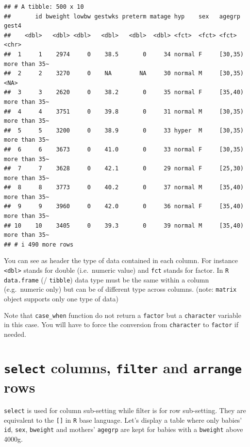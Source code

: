 \documentclass[
]{book}
\begin{document}
\begin{verbatim}
## # A tibble: 500 x 10
##       id bweight lowbw gestwks preterm matage hyp    sex   agegrp  gest4        
##    <dbl>   <dbl> <dbl>   <dbl>   <dbl>  <dbl> <fct>  <fct> <fct>   <chr>        
##  1     1    2974     0    38.5       0     34 normal F     [30,35) more than 35~
##  2     2    3270     0    NA        NA     30 normal M     [30,35) <NA>         
##  3     3    2620     0    38.2       0     35 normal F     [35,40) more than 35~
##  4     4    3751     0    39.8       0     31 normal M     [30,35) more than 35~
##  5     5    3200     0    38.9       0     33 hyper  M     [30,35) more than 35~
##  6     6    3673     0    41.0       0     33 normal F     [30,35) more than 35~
##  7     7    3628     0    42.1       0     29 normal F     [25,30) more than 35~
##  8     8    3773     0    40.2       0     37 normal M     [35,40) more than 35~
##  9     9    3960     0    42.0       0     36 normal F     [35,40) more than 35~
## 10    10    3405     0    39.3       0     39 normal M     [35,40) more than 35~
## # i 490 more rows
\end{verbatim}

You can see as header the type of data contained in each column.
For instance \texttt{\textless{}dbl\textgreater{}} stands for double (i.e.~numeric value) and \texttt{fct}
stands for factor.
In \texttt{R} \texttt{data.frame} (/ \texttt{tibble}) data type
must be the same within a column (e.g.~numeric only) but can be of different type across columns. (note: \texttt{matrix} object supports only one type of data)

Note that \texttt{case\_when} function do not return a \texttt{factor} but a \texttt{character} variable in this case.
You will have to force the conversion from \texttt{character} to \texttt{factor} if needed.

\section{\texorpdfstring{\texttt{select} columns, \texttt{filter} and \texttt{arrange} rows}{select columns, filter and arrange rows}}\label{select-columns-filter-and-arrange-rows}

\texttt{select} is used for column sub-setting while filter is for row sub-setting.
They are equivalent to the \texttt{{[}{]}} in \texttt{R} base language.
Let's display a table where only babies' \texttt{id}, \texttt{sex}, \texttt{bweight} and mothers'
\texttt{agegrp} are kept for babies with a \texttt{bweight} above 4000g.
\end{document}

